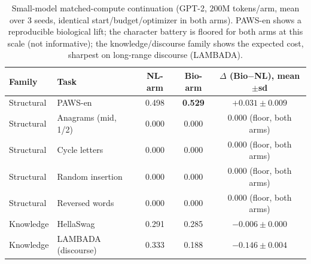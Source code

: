 \begin{table}[h]\centering\small
\caption{Small-model matched-compute continuation (GPT-2, $200$M tokens/arm, mean over 3 seeds,
identical start/budget/optimizer in both arms). PAWS-en shows a reproducible biological lift;
the character battery is floored for both arms at this scale (not informative); the
knowledge/discourse family shows the expected cost, sharpest on long-range discourse (LAMBADA).}
\label{tab:p3}
\begin{tabular}{llccc}
\toprule
Family & Task & NL-arm & Bio-arm & $\Delta$ (Bio$-$NL), mean$\pm$sd \\
\midrule
Structural & PAWS-en                  & 0.498 & \textbf{0.529} & $\mathbf{+0.031\pm0.009}$ \\
Structural & Anagrams (mid, 1/2)      & 0.000 & 0.000          & $0.000$ (floor, both arms) \\
Structural & Cycle letters            & 0.000 & 0.000          & $0.000$ (floor, both arms) \\
Structural & Random insertion         & 0.000 & 0.000          & $0.000$ (floor, both arms) \\
Structural & Reversed words           & 0.000 & 0.000          & $0.000$ (floor, both arms) \\
Knowledge  & HellaSwag                & 0.291 & 0.285          & $-0.006\pm0.000$ \\
Knowledge  & LAMBADA (discourse)      & 0.333 & 0.188          & $-0.146\pm0.004$ \\
\bottomrule
\end{tabular}
\end{table}

